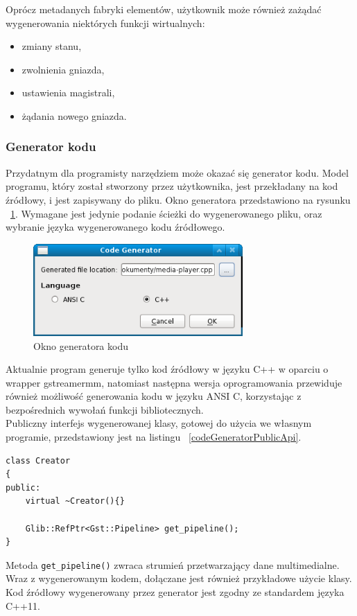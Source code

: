 \documentclass[12pt]{article}
\begin{document}
\noindent
Oprócz metadanych fabryki elementów, użytkownik może również zażądać wygenerowania niektórych funkcji wirtualnych:
\begin{itemize}
  \setlength{\itemsep}{0em}
\item zmiany stanu,
\item zwolnienia gniazda,
\item ustawienia magistrali,
\item żądania nowego gniazda.
\end{itemize}
\subsubsection{Generator kodu}
Przydatnym dla programisty narzędziem może okazać się generator kodu. Model programu, który został stworzony przez użytkownika, jest przekładany na kod źródłowy, i jest zapisywany do pliku. Okno generatora przedstawiono na rysunku ~\ref{fig:codeGenerator}. Wymagane jest jedynie podanie ścieżki do wygenerowanego pliku, oraz wybranie języka wygenerowanego kodu źródłowego.
\begin{figure}[H]
  \includegraphics[width=80mm]{img/code-generator.png}
  \caption{Okno generatora kodu}
  \label{fig:codeGenerator}
\end{figure}
Aktualnie program generuje tylko kod źródłowy w języku C++ w oparciu o wrapper gstreamermm, natomiast następna wersja oprogramowania przewiduje również możliwość generowania kodu w języku ANSI C, korzystając z bezpośrednich wywołań funkcji bibliotecznych.\\
Publiczny interfejs wygenerowanej klasy, gotowej do użycia we własnym programie, przedstawiony jest na listingu ~\ref{codeGeneratorPublicApi}.
\begin{lstlisting}[caption=Publiczny interfejs klasy stworzonej przez generator kodu, label=codeGeneratorPublicApi]
class Creator
{
public:
	virtual ~Creator(){}

	Glib::RefPtr<Gst::Pipeline> get_pipeline();
}
\end{lstlisting}
Metoda \texttt{get\_pipeline()} zwraca strumień przetwarzający dane multimedialne.\\
Wraz z wygenerowanym kodem, dołączane jest również przykładowe użycie klasy.\\
Kod źródłowy wygenerowany przez generator jest zgodny ze standardem języka C++11.
\cleardoublepage
\end{document}
